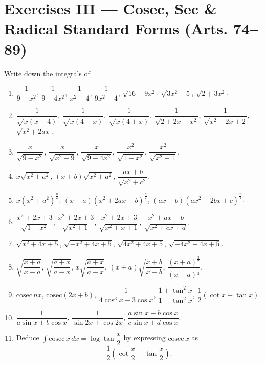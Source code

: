 \documentclass[11pt, a4paper]{article}
\begin{document}
\section*{Exercises III --- Cosec, Sec \& Radical Standard Forms (Arts. 74--89)}

Write down the integrals of

\begin{enumerate}[leftmargin=2em]

\item $\dfrac{1}{9-x^2}$, $\dfrac{1}{9-4x^2}$, $\dfrac{1}{x^2-4}$, $\dfrac{1}{9x^2-4}$, $\sqrt{16-9x^2}$, $\sqrt{3x^2-5}$, $\sqrt{2+3x^2}$.

\item $\dfrac{1}{\sqrt{x(x-4)}}$, $\dfrac{1}{\sqrt{x(4-x)}}$, $\dfrac{1}{\sqrt{x(4+x)}}$, $\dfrac{1}{\sqrt{2+2x-x^2}}$, $\dfrac{1}{\sqrt{x^2-2x+2}}$, $\sqrt{x^2+2ax}$.

\item $\dfrac{x}{\sqrt{9-x^2}}$, $\dfrac{x}{\sqrt{x^2-9}}$, $\dfrac{x}{\sqrt{9-4x^2}}$, $\dfrac{x^2}{\sqrt{1-x^2}}$, $\dfrac{x^2}{\sqrt{x^2+1}}$.

\item $x\sqrt{x^2+a^2}$, $(x+b)\sqrt{x^2+a^2}$, $\dfrac{ax+b}{\sqrt{x^2+c^2}}$.

\item $x(x^2+a^2)^{\frac{n}{2}}$, $(x+a)(x^2+2ax+b)^{\frac{n}{2}}$, $(ax-b)(ax^2-2bx+c)^{\frac{n}{2}}$.

\item $\dfrac{x^2+2x+3}{\sqrt{1-x^2}}$, $\dfrac{x^2+2x+3}{\sqrt{x^2+1}}$, $\dfrac{x^2+2x+3}{\sqrt{x^2+x+1}}$, $\dfrac{x^2+ax+b}{\sqrt{x^2+cx+d}}$.

\item $\sqrt{x^2+4x+5}$, $\sqrt{-x^2+4x+5}$, $\sqrt{4x^2+4x+5}$, $\sqrt{-4x^2+4x+5}$.

\item $\sqrt{\dfrac{x+a}{x-a}}$, $\sqrt{\dfrac{a+x}{a-x}}$, $x\sqrt{\dfrac{a+x}{a-x}}$, $(x+a)\sqrt{\dfrac{x+b}{x-b}}$, $\dfrac{(x+a)^{\frac32}}{(x-a)^{\frac12}}$.

\item $\text{cosec}\,nx$, $\text{cosec}(2x+b)$, $\dfrac{1}{4\cos^3x-3\cos x}$, $\dfrac{1+\tan^2x}{1-\tan^2x}$, $\dfrac12(\cot x+\tan x)$.

\item $\dfrac{1}{a\sin x+b\cos x}$, $\dfrac{1}{\sin 2x+\cos 2x}$, $\dfrac{a\sin x+b\cos x}{c\sin x+d\cos x}$.

\item Deduce $\displaystyle\int \text{cosec}\,x\,dx=\log\tan\dfrac{x}{2}$ by expressing $\text{cosec}\,x$ as
\[
\dfrac12\left(\cot\dfrac{x}{2}+\tan\dfrac{x}{2}\right).
\]


\end{enumerate}
\end{document}
